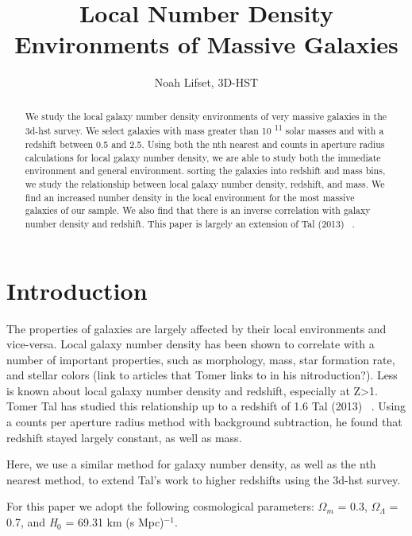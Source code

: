 \documentclass[apj]{emulateapj}
\begin{document}
 
\title{Local Number Density Environments of Massive Galaxies}

\author{Noah Lifset, 3D-HST}

\begin{abstract}

We study the local galaxy number density environments of very massive galaxies in the 3d-hst survey. We select galaxies with mass greater than 10 \textsuperscript{11} solar masses and with a redshift between 0.5 and 2.5. Using both the nth nearest and counts in aperture radius calculations for local galaxy number density, we are able to study both the immediate environment and general environment. sorting the galaxies into  redshift and mass bins, we study the relationship between local galaxy number density, redshift, and mass. We find an increased number density in the local environment for the most massive galaxies of our sample. We also find that there is an inverse correlation with galaxy number density and redshift. This paper is largely an extension of Tal (2013) ~\cite{2013ApJ...769...31T}.

\end{abstract}
\keywords{}

\section{Introduction}

The properties of galaxies are largely affected by their local environments and vice-versa. Local galaxy number density has been shown to correlate with a number of important properties, such as morphology, mass, star formation rate, and stellar colors (link to articles that Tomer links to in his nitroduction?). Less is known about local galaxy number density and redshift, especially at Z\textgreater1. Tomer Tal has studied this relationship up to a redshift of 1.6 Tal (2013) ~\cite{2013ApJ...769...31T}. Using a counts per aperture radius method with background subtraction, he found that redshift stayed largely constant, as well as mass.

Here, we use a similar method for galaxy number density, as well as the nth nearest method, to extend Tal's work to higher redshifts using the 3d-hst survey.

For this paper we adopt the following cosmological parameters: $\Omega_{m}$ = 0.3, $\Omega_{\Lambda}$ = 0.7, and \textit{H}$_{0}$ = 69.31 km (s Mpc)$^{-1}$.
\end{document}

